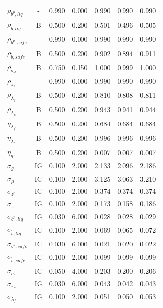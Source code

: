 \documentclass[12pt]{article}
\begin{document}
{\begin{longtable}{lcccccc}
$\rho_{b^p,liq}$ & - &    0.990 &    0.000 &    0.990 &    0.990 &    0.990 \\
$\rho_{\tilde{b},liq}$ & B &    0.500 &    0.200 &    0.501 &    0.496 &    0.505 \\
$\rho_{b^p,safe}$ & - &    0.990 &    0.000 &    0.990 &    0.990 &    0.990 \\
$\rho_{\tilde{b},safe}$ & B &    0.500 &    0.200 &    0.902 &    0.894 &    0.911 \\
$\rho_{\sigma_\omega}$ & B &    0.750 &    0.150 &    1.000 &    0.999 &    1.000 \\
$\rho_{\pi_*}$ & - &    0.990 &    0.000 &    0.990 &    0.990 &    0.990 \\
$\rho_{\lambda_f}$ & B &    0.500 &    0.200 &    0.810 &    0.808 &    0.811 \\
$\rho_{\lambda_w}$ & B &    0.500 &    0.200 &    0.943 &    0.941 &    0.944 \\
$\eta_{\lambda_f}$ & B &    0.500 &    0.200 &    0.684 &    0.684 &    0.684 \\
$\eta_{\lambda_w}$ & B &    0.500 &    0.200 &    0.996 &    0.996 &    0.996 \\
$\eta_{gz}$ & B &    0.500 &    0.200 &    0.007 &    0.007 &    0.007 \\
$\sigma_{g}$ & IG &    0.100 &    2.000 &    2.133 &    2.096 &    2.186 \\
$\sigma_{\mu}$ & IG &    0.100 &    2.000 &    3.125 &    3.063 &    3.210 \\
$\sigma_{z^p}$ & IG &    0.100 &    2.000 &    0.374 &    0.374 &    0.374 \\
$\sigma_{z}$ & IG &    0.100 &    2.000 &    0.173 &    0.158 &    0.186 \\
$\sigma_{b^p, liq}$ & IG &    0.030 &    6.000 &    0.028 &    0.028 &    0.029 \\
$\sigma_{\tilde{b}, liq}$ & IG &    0.100 &    2.000 &    0.069 &    0.065 &    0.072 \\
$\sigma_{b^p, safe}$ & IG &    0.030 &    6.000 &    0.021 &    0.020 &    0.022 \\
$\sigma_{\tilde{b}, safe}$ & IG &    0.100 &    2.000 &    0.099 &    0.099 &    0.099 \\
$\sigma_{\sigma_\omega}$ & IG &    0.050 &    4.000 &    0.203 &    0.200 &    0.206 \\
$\sigma_{\pi_*}$ & IG &    0.030 &    6.000 &    0.043 &    0.042 &    0.043 \\
$\sigma_{\lambda_f}$ & IG &    0.100 &    2.000 &    0.051 &    0.050 &    0.053 \\

\end{longtable}}
\end{document}
